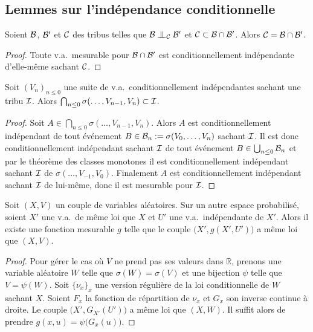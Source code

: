 \documentclass[12pt,a4paper]{article}
\begin{document}
\begin{appendices}

\section{Lemmes sur l'indépendance conditionnelle}

\begin{lemme}\label{lemme:CIinter}
Soient $\mathcal{B}$, $\mathcal{B}'$ et $\mathcal{C}$ des tribus telles que $\BB \indep_\CC \BB'$ 
et $\mathcal{C} \subset \mathcal{B} \cap \mathcal{B}'$. Alors $\mathcal{C} = \mathcal{B}\cap\mathcal{B}'$.
\end{lemme}

\begin{proof}
Toute v.a.\ mesurable pour $\mathcal{B}\cap\mathcal{B}'$ est conditionnellement indépendante 
d'elle-même sachant $\mathcal{C}$. 
\end{proof}


\begin{lemme}\label{lemme:tribuI}
Soit ${(V_n)}_{n \leq 0}$ une suite de v.a.\ conditionnellement indépendantes 
sachant une tribu $\mathcal{I}$. Alors 
$\bigcap_{n \leq 0}\sigma(\ldots, V_{n-1}, V_n) \subset \mathcal{I}$.
\end{lemme}

\begin{proof}
Soit $A \in \bigcap_{n \leq 0}\sigma(\ldots, V_{n-1}, V_n)$. Alors $A$ est conditionnellement 
indépendant de tout événement 
$B \in \mathcal{B}_n := \sigma(V_0, \ldots, V_n)$ sachant 
$\mathcal{I}$. Il est donc conditionnellement 
indépendant sachant $\mathcal{I}$ de tout événement 
$B \in \bigcup_{n \leq 0}\mathcal{B}_n$ et par le théorème des classes monotones 
il est conditionnellement indépendant sachant $\mathcal{I}$ de $\sigma(\ldots, V_{-1}, V_0)$. 
Finalement $A$ est conditionnellement indépendant sachant 
$\mathcal{I}$ de lui-même, donc il est mesurable pour $\mathcal{I}$. 
\end{proof}

 
\begin{lemme}\label{lemme:representation}
Soit $(X,V)$ un couple de variables aléatoires.  
Sur un autre espace probabilisé, soient $X'$ une v.a.\ de même loi que 
$X$ et $U'$ une v.a.\ indépendante de $X'$. 
Alors il existe une fonction mesurable $g$ telle que le couple 
$\bigl(X', g(X',U')\bigr)$ a même loi que $(X,V)$. 
\end{lemme}

\begin{proof}
Pour gérer le cas où $V$ ne prend pas ses valeurs dans $\mathbb{R}$, prenons 
une variable aléatoire $W$ telle que $\sigma(W)=\sigma(V)$ et une bijection 
$\psi$ telle que $V=\psi(W)$. 
Soit $\{\nu_x\}_{x}$ une version régulière de la loi conditionnelle 
de $W$ sachant $X$. Soient $F_x$ la fonction de répartition de $\nu_x$ 
et $G_x$ son inverse continue à droite. 
Le couple $\bigl(X', G_{X'}(U')\bigr)$ a même loi que $(X,W)$. 
 Il suffit alors de prendre $g(x,u) = \psi\bigl(G_x(u)\bigr)$. 
\end{proof}




\end{appendices}
\end{document}
